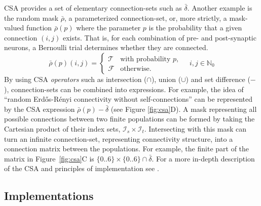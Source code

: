 \documentclass{frontiersSCNS} %
\newcommand{\Figure}[2]{Figure~\ref{#2}}
\newcommand{\Figure}[2]{Figure~#1}
\begin{document}
CSA provides a set of elementary connection-sets such as
$\bar{\delta}$. Another example is the random mask $\bar{\rho}$, a
parameterized connection-set, or, more strictly, a mask-valued
function $\bar{\rho}(p)$ where the parameter $p$ is the probability
that a given connection $(i, j)$ exists.  That is, for each
combination of pre- and post-synaptic neurons, a Bernoulli trial
determines whether they are connected.
\begin{equation*}
  \bar{\rho} (p) (i, j) =
  \begin{cases}
    \mathcal{T}& \text{with probability $p$},\\
    \mathcal{F}& \text{otherwise}.
  \end{cases}
  \quad i, j \in \mathbb{N}_0
\end{equation*}
By using CSA \emph{operators} such as intersection ($\cap$), union
($\cup$) and set difference ($-$), connection-sets can be combined into
expressions. For example, the idea of ``random Erd\H{o}s-R\'enyi
connectivity without self-connections'' can be represented by the CSA
expression $\bar{\rho}(p) - \bar{\delta}$ (see Figure
\ref{fig:csa}D). A mask representing all possible connections between
two finite populations can be formed by taking the Cartesian product
of their index sets, $\mathcal{I}_s \times
\mathcal{I}_t$. Intersecting with this mask can turn an infinite
connection-set, representing connectivity structure, into a connection
matrix between the populations. For example, the finite part of the
matrix in \Figure{1}{fig:csa}C is $\{0..6\} \times \{0..6\} \cap
\bar{\delta}$. For a more in-depth description of the CSA and
principles of implementation see \citet{djurfeldt12}.

\subsection{Implementations}\label{sec:impl}
\end{document}
